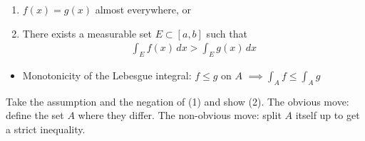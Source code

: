 \begin{enumerate}
\def\labelenumi{\arabic{enumi}.}
\tightlist
\item
  \(f(x) = g(x)\) almost everywhere, or
\item
  There exists a measurable set \(E \subset [a, b]\) such that
  \begin{align*}
  \int _{E} f(x) \, dx > \int _{E} g(x) \, dx
  \end{align*}
\end{enumerate}

\begin{concept}

\envlist

\begin{itemize}
\tightlist
\item
  Monotonicity of the Lebesgue integral: \(f\leq g\) on \(A\)
  \(\implies \int_A f \leq \int_A g\)
\end{itemize}

\end{concept}

\begin{strategy}

Take the assumption and the negation of (1) and show (2). The obvious
move: define the set \(A\) where they differ. The non-obvious move:
split \(A\) itself up to get a strict inequality.

\end{strategy}

